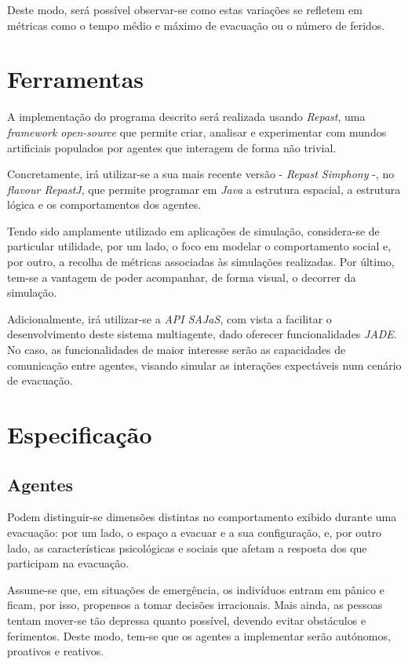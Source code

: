 \documentclass[12pt]{article}
\begin{document}
\begin{titlepage}
Deste modo, será possível observar-se como estas variações se refletem em métricas como o tempo médio e máximo de evacuação ou o número de feridos.

\section{Ferramentas}
A implementação do programa descrito será realizada usando \textit{Repast}, uma \textit{framework open-source} que permite criar, analisar e experimentar com mundos artificiais populados por agentes que interagem de forma não trivial.

Concretamente, irá utilizar-se a sua mais recente versão - \textit{Repast Simphony} -, no \textit{flavour RepastJ}, que permite programar em \textit{Java} a estrutura espacial, a estrutura lógica e os comportamentos dos agentes.

Tendo sido amplamente utilizado em aplicações de simulação, considera-se de particular utilidade, por um lado, o foco em modelar o comportamento social e, por outro, a recolha de métricas associadas às simulações realizadas. Por último, tem-se a vantagem de poder acompanhar, de forma visual, o decorrer da simulação.

Adicionalmente, irá utilizar-se a \textit{API SAJaS}, com vista a facilitar o desenvolvimento deste sistema multiagente, dado oferecer funcionalidades \textit{JADE}. 
No caso, as funcionalidades de maior interesse serão as capacidades de comunicação entre agentes, visando simular as interações expectáveis num cenário de evacuação.

\section{Especificação}
\subsection{Agentes}

Podem distinguir-se dimensões distintas no comportamento exibido durante uma evacuação: por um lado, o espaço a evacuar e a sua configuração, e, por outro lado, as características psicológicas e sociais que afetam a resposta dos que participam na evacuação.

Assume-se que, em situações de emergência, os indivíduos entram em pânico e ficam, por isso, propensos a tomar decisões irracionais. Mais ainda, as pessoas tentam mover-se tão depressa quanto possível, devendo evitar obstáculos e ferimentos.
Deste modo, tem-se que os agentes a implementar serão autónomos, proativos e reativos.


\end{titlepage}
\end{document}

